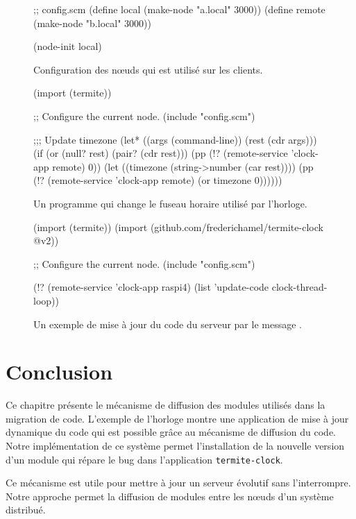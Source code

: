 \begin{figure}[h!]
\begin{center}
\begin{mplisting}{1}
;; config.scm
(define local (make-node "a.local" 3000))
(define remote (make-node "b.local" 3000))

(node-init local)
\end{mplisting}
\end{center}
  \caption{Configuration des nœuds qui est utilisé sur les clients.}
  \vspace*{4ex}
\end{figure}

\begin{figure}[h!]
\begin{center}
\begin{mplisting}{1}
(import (termite))

;; Configure the current node.
(include "config.scm")

;;; Update timezone
(let* ((args (command-line))
       (rest (cdr args)))
  (if (or (null? rest)
          (pair? (cdr rest)))
      (pp (!? (remote-service 'clock-app remote) 0))
      (let ((timezone (string->number (car rest))))
        (pp (!? (remote-service 'clock-app remote) (or timezone 0))))))
\end{mplisting}
\end{center}
  \caption{Un programme qui change le fuseau horaire utilisé par
    l'horloge.}
  \vspace*{4ex}
\end{figure}

\begin{figure}[h!]
\begin{center}
\begin{mplisting}{1}
(import (termite))
(import (github.com/frederichamel/termite-clock @v2))

;; Configure the current node.
(include "config.scm")

(!? (remote-service 'clock-app raspi4)
    (list 'update-code clock-thread-loop))
\end{mplisting}
\end{center}
  \caption{Un exemple de mise à jour du code du serveur
    par le message .}
  \vspace*{4ex}
\end{figure}

\section{Conclusion}
Ce chapitre présente le mécanisme de diffusion des modules utilisés
dans la migration de code. L'exemple de l'horloge montre une application
de mise à jour dynamique du code qui est possible grâce au mécanisme
de diffusion du code. Notre implémentation de ce système permet l'installation
de la nouvelle version d'un module qui répare le bug dans l'application
\texttt{termite-clock}.

Ce mécanisme est utile pour mettre à jour un serveur évolutif
sans l'interrompre. Notre approche permet la diffusion de modules
entre les nœuds d'un système distribué.

